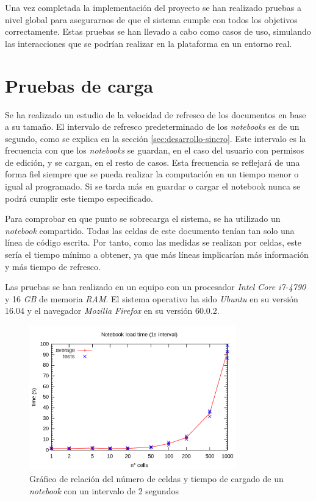 \documentclass[11pt,spanish,listoffigures]{tfgetsinf}
\begin{document}
Una vez completada la implementación del proyecto se han realizado pruebas a nivel global para asegurarnos de que el sistema cumple con todos los objetivos correctamente. Estas pruebas se han llevado a cabo como casos de uso, simulando las interacciones que se podrían realizar en la plataforma en un entorno real.



\section{Pruebas de carga}
\label{sec:pruebas de carga}

Se ha realizado un estudio de la velocidad de refresco de los documentos en base a su tamaño. El intervalo de refresco predeterminado de los \textit{notebooks} es de un segundo, como se explica en la sección \ref{sec:desarrollo-sincro}. Este intervalo es la frecuencia con que los \textit{notebooks} se guardan, en el caso del usuario con permisos de edición, y se cargan, en el resto de casos. Esta frecuencia se reflejará de una forma fiel siempre que se pueda realizar la computación en un tiempo menor o igual al programado. Si se tarda más en guardar o cargar el notebook nunca se podrá cumplir este tiempo especificado.

Para comprobar en que punto se sobrecarga el sistema, se ha utilizado un \textit{notebook} compartido. Todas las celdas de este documento tenían tan solo una línea de código escrita. Por tanto, como las medidas se realizan por celdas, este sería el tiempo mínimo a obtener, ya que más líneas implicarían más información y más tiempo de refresco. 

Las pruebas se han realizado en un equipo con un procesador \textit{Intel Core i7-4790} y 16 \textit{GB} de memoria \textit{RAM}. El sistema operativo ha sido \textit{Ubuntu} en su versión 16.04 y el navegador \textit{Mozilla Firefox} en su versión 60.0.2.

\begin{figure}[h]
	\centering
  	\includegraphics[width=0.8\textwidth]{loadplot.png}
  	\caption{Gráfico de relación del número de celdas y tiempo de cargado de un \textit{notebook} con un intervalo de 2 segundos}
  	\label{fig:loadplot}
\end{figure}
\end{document}
